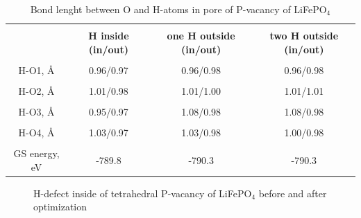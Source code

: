 \documentclass[11pt]{article}
\begin{document}
\begin{table}[H]
\scriptsize{
\caption{Bond lenght between O and H-atoms in pore of P-vacancy of LiFePO$_4$}
\label{Ppos1}
\begin{center}
\begin{tabular}{|c|c|c|c|}
\hline
& & & \\
 \textbf{ } & \textbf{H inside (in/out)}& \textbf{one H outside (in/out)} & \textbf{two H outside (in/out)} \\ 
\hline
& & & \\
H-O1, \AA & 0.96/0.97 & 0.96/0.98 & 0.96/0.98 \\ 
\hline
& & & \\
H-O2, \AA & 1.01/0.98 & 1.01/1.00 & 1.01/1.01 \\
\hline
& & & \\
H-O3, \AA & 0.95/0.97 & 1.08/0.98  & 1.08/0.98  \\
\hline
& & & \\
H-O4, \AA & 1.03/0.97 & 1.03/0.98 & 1.00/0.98 \\
\hline
& & & \\
GS energy, eV & -789.8 & -790.3 & -790.3 \\
\hline
\end{tabular}
\end{center}
}
\end{table}

\begin{figure}[H]
\begin{minipage}[h]{0.48\linewidth}
\end{minipage}
\hfill
\begin{minipage}[h]{0.48\linewidth}
\end{minipage}
\caption{H-defect inside of tetrahedral P-vacancy of LiFePO$_4$ before and after optimization}
\label{h21}
\end{figure}
\end{document}
